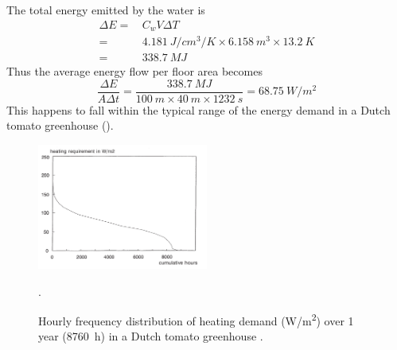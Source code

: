 The total energy emitted by the water is
\begin{align*}
  \Delta E =&\, C_w V \Delta T \\
           =&\, \SI{4.181}{J/cm^3/K} \times \SI{6.158}{m^3} \times \SI{13.2}{K}  \\
           =&\, \SI{338.7}{MJ}
\end{align*}
Thus the average energy flow per floor area becomes
\[
  \frac{\Delta E}{A \Delta t} = \frac{\SI{338.7}{MJ}}{\SI{100}{m}\times\SI{40}{m}\times\SI{1232}{s}} = \SI{68.75}{W/m^2}
\]
This happens to fall within the typical range of the energy demand in a Dutch tomato greenhouse ().

\begin{figure} [hb]
\centering
\includegraphics[width=0.5\textwidth]{graphics/vg/heating-demand.png}
\caption{Hourly frequency distribution of heating demand (\si{W/m^2}) over 1 year (\SI{8760}{\hour}) in a Dutch tomato greenhouse  \citep[from][Fig.~4.3.1]{Braak95}.}.
\label{fig:vg-heating-demand}
\end{figure}



